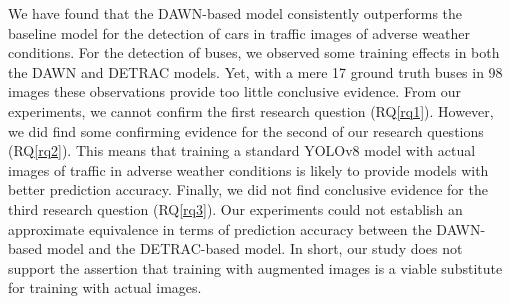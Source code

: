 \documentclass[]{article}
\begin{document}
We have found that the DAWN-based model consistently outperforms the baseline model for the detection of cars in traffic images of adverse weather conditions. For the detection of buses, we observed some training effects in both the DAWN and DETRAC models. Yet, with a mere 17 ground truth buses in 98 images these observations provide too little conclusive evidence. From our experiments, we cannot confirm the first research question (RQ\ref{rq1}). However, we did find some confirming evidence for the second of our research questions (RQ\ref{rq2}). This means that training a standard YOLO\small{v8} model with actual images of traffic in adverse weather conditions is likely to provide models with better prediction accuracy. Finally, we did not find conclusive evidence for the third research question (RQ\ref{rq3}). Our experiments could not establish an approximate equivalence in terms of prediction accuracy between the DAWN-based model and the DETRAC-based model. In short, our study does not support the assertion that training with augmented images is a viable substitute for training with actual images. 
\end{document}
